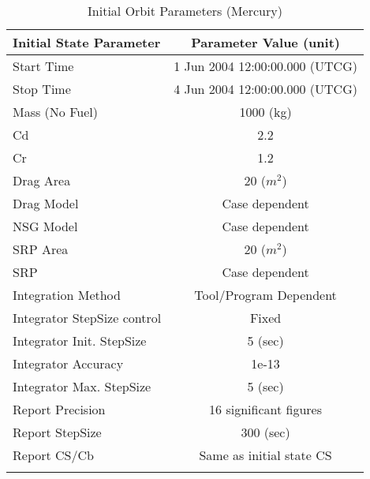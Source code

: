 \begin{table}[htbp!]
\centering \caption{Initial Orbit Parameters (Mercury)}
      \begin{tabular}{lc}
      \hline\hline
            Initial State Parameter & Parameter Value (unit)\\
            \hline
            Start Time & 1 Jun 2004 12:00:00.000 (UTCG)\\
            Stop Time & 4 Jun 2004 12:00:00.000 (UTCG)\\
            
            Mass (No Fuel) & 1000 (kg)\\
            Cd & 2.2\\
            Cr & 1.2\\
            Drag Area & 20 ($m^2$)\\
            Drag Model & Case dependent\\
            NSG Model & Case dependent\\
            SRP Area & 20 ($m^2$)\\
            SRP & Case dependent\\
            Integration Method & Tool/Program Dependent\\
            Integrator StepSize control & Fixed\\
            Integrator Init. StepSize & 5 (sec)\\
            Integrator Accuracy & 1e-13\\
            Integrator Max. StepSize & 5 (sec)\\
            Report Precision & 16 significant figures\\
            Report StepSize & 300 (sec)\\
            Report CS/Cb & Same as initial state CS\\
      \hline\hline
      \label{Table: InitStateMercury}
\end{tabular}
\end{table}

